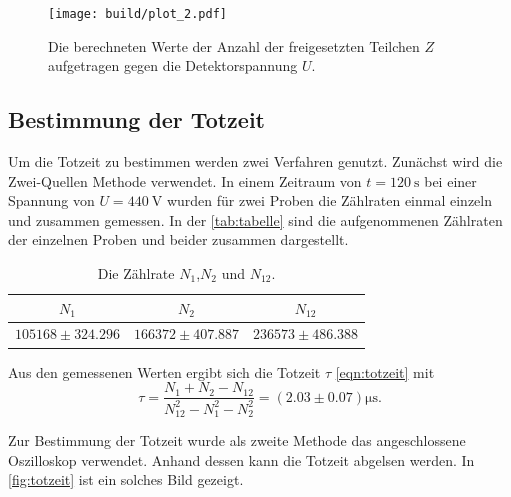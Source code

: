 \begin{figure}[H]
	\texttt{[image: build/plot\_2.pdf]}
	\caption{Die berechneten Werte der Anzahl der freigesetzten Teilchen $Z$ aufgetragen gegen die Detektorspannung $U$.}
	\label{fig:plot_2}
\end{figure}

\subsection{Bestimmung der Totzeit}
\label{sec:Bestimmung der Totzeit}

Um die Totzeit zu bestimmen werden zwei Verfahren genutzt. Zunächst wird die Zwei-Quellen Methode
verwendet. In einem Zeitraum von $t = \SI{120}{\second}$ bei einer Spannung von $U = \SI{440}{\volt}$ wurden für zwei Proben
die Zählraten einmal einzeln und zusammen gemessen.
In der \autoref{tab:tabelle} sind die aufgenommenen Zählraten der einzelnen Proben und beider zusammen dargestellt.

\begin{table}[H]
    \centering
    \caption{Die Zählrate $N_1$,$N_2$ und $N_{12}$.}
    \label{tab:tabelle}
    \begin{tabular}{c c c}
    \toprule
    $N_1$ & $N_2$ & $N_{12}$ \\
    \midrule
    $105168 \pm 324.296$ & $166372 \pm 407.887$ &$236573 \pm 486.388$ \\
    \bottomrule
    \end{tabular}
\end{table}

Aus den gemessenen Werten ergibt sich die Totzeit $\tau$ \eqref{eqn:totzeit} mit
\begin{equation*}
    \tau =\frac{N_1+N_2-N_{12}}{N_{12}^2-N_1^2-N_2^2} = \left(2.03 \pm 0.07\right) \si{\micro\second}.
\end{equation*}

Zur Bestimmung der Totzeit wurde als zweite Methode das angeschlossene Oszilloskop verwendet. Anhand dessen kann die Totzeit
abgelsen werden. In \autoref{fig:totzeit} ist ein solches Bild gezeigt.

